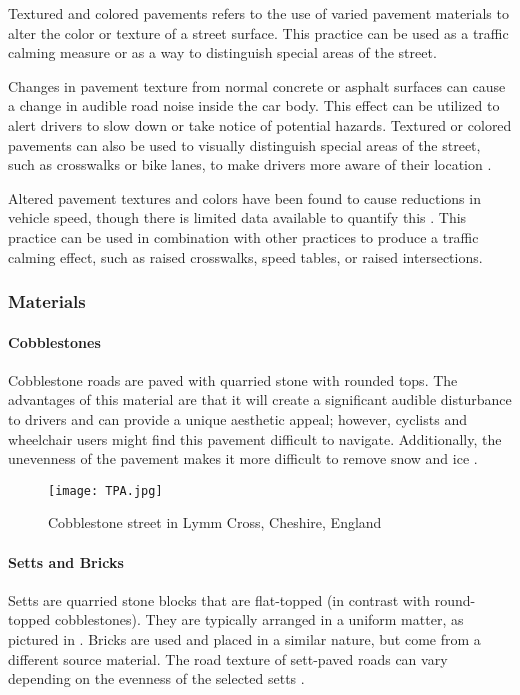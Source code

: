 Textured and colored pavements refers to the use of varied pavement materials to alter the color or texture of a street surface. This practice can be used as a traffic calming measure or as a way to distinguish special areas of the street.

Changes in pavement texture from normal concrete or asphalt surfaces can cause a change in audible road noise inside the car body. This effect can be utilized to alert drivers to slow down or take notice of potential hazards. Textured or colored pavements can also be used to visually distinguish special areas of the street, such as crosswalks or bike lanes, to make drivers more aware of their location \cite{TP1}.

Altered pavement textures and colors have been found to cause reductions in vehicle speed, though there is limited data available to quantify this \cite{TP3}. This practice can be used in combination with other practices to produce a traffic calming effect, such as raised crosswalks, speed tables, or raised intersections. 

\subsubsection{Materials}

\paragraph{Cobblestones} Cobblestone roads are paved with quarried stone with rounded tops. The advantages of this material are that it will create a significant audible disturbance to drivers and can provide a unique aesthetic appeal; however, cyclists and wheelchair users might find this pavement difficult to navigate. Additionally, the unevenness of the pavement makes it more difficult to remove snow and ice \cite{TP6}.

\begin{figure}[h]
\centering
\texttt{[image: TPA.jpg]}
\caption[Cobblestone street in Lymm Cross, Cheshire, England]{Cobblestone street in Lymm Cross, Cheshire, England}\label{fig:TPA}
\end{figure}

\paragraph{Setts and Bricks} Setts are quarried stone blocks that are flat-topped (in contrast with round-topped cobblestones). They are typically arranged in a uniform matter, as pictured in . Bricks are used and placed in a similar nature, but come from a different source material.  The road texture of sett-paved roads can vary depending on the evenness of the selected setts \cite{TP4}.

